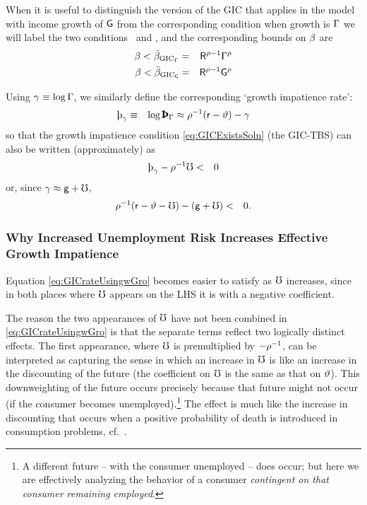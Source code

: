 \documentclass{handout}
\begin{document}
When it is useful to distinguish the version of the GIC that applies in the model with income growth of $\mathsf{G}$ from the corresponding condition when growth is $\Gamma$ we will label the two conditions \GICPGro~and \GICWGro, and the corresponding bounds on $\beta$ are 
\providecommand{\DiscountMaxGICPGro}{\bar{\Discount}_{\text{GIC}_\PGro}}
\providecommand{\DiscountMaxGICWGro}{\bar{\Discount}_{\text{GIC}_\WGro}}
\begin{eqnarray}
   \Discount < \DiscountMaxGICPGro & = & \Rfree^{\CRRA-1}\PGro^{\CRRA}
\\ \Discount < \DiscountMaxGICWGro & = & \Rfree^{\CRRA-1}\WGro^{\CRRA}
\end{eqnarray}



Using $\gamma \equiv \log \Gamma$, we similarly define the corresponding `growth impatience rate':
\begin{eqnarray}
  \patpGro & \equiv & \log \PatPGro \approx \CRRA^{-1}(\rfree-\timeRate) - \pGro
\end{eqnarray}
so that the growth impatience condition \eqref{eq:GICExistsSoln} (the GIC-TBS) can also be written (approximately) as
\begin{eqnarray}
  \patpGro - \CRRA^{-1}\urate & < & 0   \label{eq:GICrateUsingpGro}
\end{eqnarray}
or, since $\gamma \approx \mathsf{g}+\mho$, 
\begin{eqnarray}
 \rho^{-1}(\mathsf{r}-\vartheta-\mho)-(\mathsf{g}+\mho) & < & 0 \label{eq:GICrateUsingwGro}
.
\end{eqnarray}

\subsubsection{Why Increased Unemployment Risk Increases Effective Growth Impatience}

Equation \eqref{eq:GICrateUsingwGro} becomes easier to satisfy as $\mho$ increases, since 
in both places where $\mho$ appears on the LHS it is with a negative coefficient.

The reason the two appearances of $\mho$ have not been combined in \eqref{eq:GICrateUsingwGro} is that the separate 
terms reflect two logically distinct effects.  The first appearance, where $\mho$ is premultiplied by $-\rho^{-1}$, 
can be interpreted as capturing the sense in which an increase in $\mho$ is like an increase in the discounting of the future (the
coefficient on $\mho$ is the same as that on $\vartheta$).  This downweighting of the future occurs precisely because that future
might not occur (if the consumer becomes unemployed).\footnote{A different future -- with the consumer unemployed -- does occur; but here we are effectively analyzing the behavior of a consumer {\it contingent on that consumer remaining employed}.}  The effect is much like the increase in discounting that occurs 
when a positive probability of death is introduced in consumption problems, cf.~\cite{blanchardFinite}.
\end{document}
